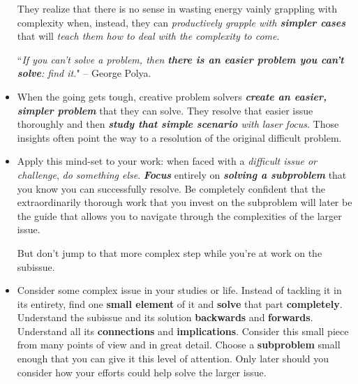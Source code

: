 \documentclass[11pt]{article}
\begin{document}
\begin{itemize}
They realize that there is no sense in wasting energy vainly grappling with complexity when, instead, they can \emph{productively grapple with \textbf{simpler cases}} that will \emph{teach them how to deal with the complexity to come}.

``\emph{If you can’t solve a problem, then \textbf{there is an easier problem you can’t solve}: find it.}" -- George Polya.

\item When the going gets tough, creative problem solvers \emph{\textbf{create an easier, simpler problem}} that they can solve. They resolve that easier issue thoroughly and then \emph{\textbf{study that simple scenario} with laser focus}. Those insights often point the way to a resolution of the original difficult problem.

\item Apply this mind-set to your work: when faced with a \emph{difficult issue or challenge}, \emph{do something else}. \emph{\textbf{Focus}} entirely on \emph{\textbf{solving a subproblem}} that you know you can successfully resolve. Be completely confident that the extraordinarily thorough work that you invest on the subproblem will later be the guide that allows you to navigate through the complexities of the larger issue. 

But don’t jump to that more complex step while you’re at work on the subissue. 

\item \begin{exercise}
Consider some complex issue in your studies or life. Instead of tackling it in its entirety, find one \textbf{small element} of it and \textbf{solve} that part \textbf{completely}. Understand the subissue and its solution \textbf{backwards} and \textbf{forwards}. Understand all its \textbf{connections} and \textbf{implications}. Consider this small piece from many points of view and in great detail. Choose a \textbf{subproblem} small enough that you can
give it this level of attention. Only later should you consider how your efforts could help solve the larger issue.
\end{exercise}
\end{itemize}
\end{document}
